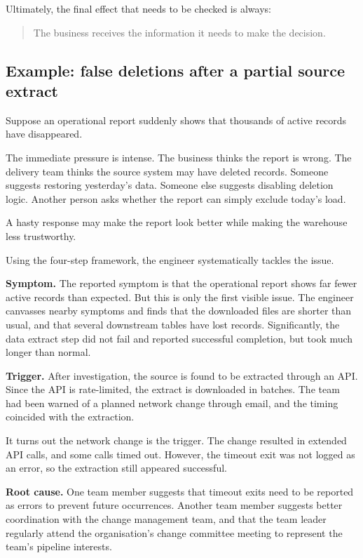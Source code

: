 \documentclass[10pt,openany,10pt]{book}
\begin{document}
Ultimately, the final effect that needs to be checked is always:

\begin{quote}
The business receives the information it needs to make the decision.
\end{quote}

\subsection{Example: false deletions after a partial source
extract}\label{example-false-deletions-after-a-partial-source-extract}

Suppose an operational report suddenly shows that thousands of active
records have disappeared.

The immediate pressure is intense. The business thinks the report is
wrong. The delivery team thinks the source system may have deleted
records. Someone suggests restoring yesterday's data. Someone else
suggests disabling deletion logic. Another person asks whether the
report can simply exclude today's load.

A hasty response may make the report look better while making the
warehouse less trustworthy.

Using the four-step framework, the engineer systematically tackles the
issue.

\textbf{Symptom.} The reported symptom is that the operational report
shows far fewer active records than expected. But this is only the first
visible issue. The engineer canvasses nearby symptoms and finds that the
downloaded files are shorter than usual, and that several downstream
tables have lost records. Significantly, the data extract step did not
fail and reported successful completion, but took much longer than
normal.

\textbf{Trigger.} After investigation, the source is found to be
extracted through an API. Since the API is rate-limited, the extract is
downloaded in batches. The team had been warned of a planned network
change through email, and the timing coincided with the extraction.

It turns out the network change is the trigger. The change resulted in
extended API calls, and some calls timed out. However, the timeout exit
was not logged as an error, so the extraction still appeared successful.

\textbf{Root cause.} One team member suggests that timeout exits need to
be reported as errors to prevent future occurrences. Another team member
suggests better coordination with the change management team, and that
the team leader regularly attend the organisation's change committee
meeting to represent the team's pipeline interests.
\end{document}
